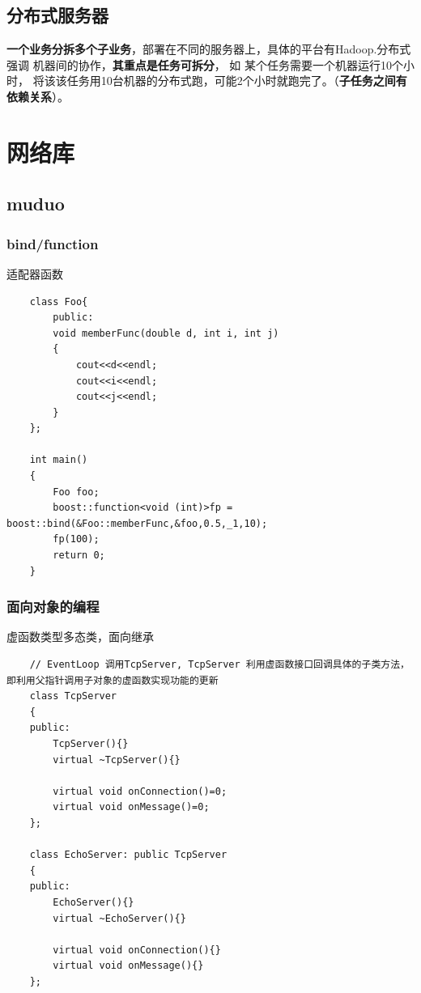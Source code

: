 \documentclass[UTF8,a4paper,12pt]{ctexbook}
\begin{document}
	\section{分布式服务器}
			\textbf{一个业务分拆多个子业务}，部署在不同的服务器上，具体的平台有Hadoop.分布式 强调 机器间的协作，\textbf{其重点是任务可拆分}， 如 某个任务需要一个机器运行10个小时， 将该该任务用10台机器的分布式跑，可能2个小时就跑完了。（\textbf{子任务之间有依赖关系}）。
\chapter{网络库}
	\section{muduo}
		\subsection{bind/function}适配器函数
			\begin{lstlisting}
	class Foo{
		public:
		void memberFunc(double d, int i, int j)
		{
			cout<<d<<endl;
			cout<<i<<endl;
			cout<<j<<endl;
		}
	};
	
	int main()
	{
		Foo foo;
		boost::function<void (int)>fp = boost::bind(&Foo::memberFunc,&foo,0.5,_1,10);
		fp(100);
		return 0;
	}
			\end{lstlisting}
		
		\subsection{面向对象的编程}虚函数类型多态类，面向继承
			\begin{lstlisting}
	// EventLoop 调用TcpServer, TcpServer 利用虚函数接口回调具体的子类方法，即利用父指针调用子对象的虚函数实现功能的更新
	class TcpServer
	{
	public:
		TcpServer(){}
		virtual ~TcpServer(){}
		
		virtual void onConnection()=0;
		virtual void onMessage()=0;
	};
	
	class EchoServer: public TcpServer
	{
	public:
		EchoServer(){}
		virtual ~EchoServer(){}
		
		virtual void onConnection(){}
		virtual void onMessage(){}		
	};		
			\end{lstlisting}
			
\end{document}
